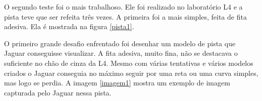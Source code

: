 	\begin{figure}[H]
		\centering
\end{figure}

O segundo teste foi o mais trabalhoso. Ele foi realizado no laboratório L4 e a pista teve que ser refeita três vezes. A primeira foi a mais simples, feita de fita adesiva. Ela é mostrada na figura \ref{pista1}.

	\begin{figure}[H]
		\centering
\end{figure}

O primeiro grande desafio enfrentado foi desenhar um modelo de pista que Jaguar conseguisse visualizar. A fita adesiva, muito fina, não se destacava o suficiente no chão de cinza da L4. Mesmo com várias tentativas e vários modelos criados o Jaguar conseguia no máximo seguir por uma reta ou uma curva simples, mas logo se perdia. A imagem \ref{imagem1} mostra um exemplo de imagem capturada pelo Jaguar nessa pista.

